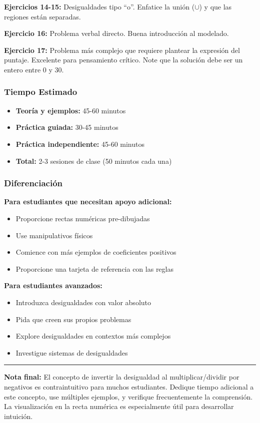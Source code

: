 \textbf{Ejercicios 14-15:} Desigualdades tipo ``o''. Enfatice la unión ($\cup$) y que las regiones están separadas.

\textbf{Ejercicio 16:} Problema verbal directo. Buena introducción al modelado.

\textbf{Ejercicio 17:} Problema más complejo que requiere plantear la expresión del puntaje. Excelente para pensamiento crítico. Note que la solución debe ser un entero entre 0 y 30.

\subsubsection*{Tiempo Estimado}

\begin{itemize}
    \item \textbf{Teoría y ejemplos:} 45-60 minutos
    \item \textbf{Práctica guiada:} 30-45 minutos
    \item \textbf{Práctica independiente:} 45-60 minutos
    \item \textbf{Total:} 2-3 sesiones de clase (50 minutos cada una)
\end{itemize}

\subsubsection*{Diferenciación}

\textbf{Para estudiantes que necesitan apoyo adicional:}
\begin{itemize}
    \item Proporcione rectas numéricas pre-dibujadas
    \item Use manipulativos físicos
    \item Comience con más ejemplos de coeficientes positivos
    \item Proporcione una tarjeta de referencia con las reglas
\end{itemize}

\textbf{Para estudiantes avanzados:}
\begin{itemize}
    \item Introduzca desigualdades con valor absoluto
    \item Pida que creen sus propios problemas
    \item Explore desigualdades en contextos más complejos
    \item Investigue sistemas de desigualdades
\end{itemize}

\vspace{1cm}

\hrule

\vspace{0.5cm}

\textbf{Nota final:} El concepto de invertir la desigualdad al multiplicar/dividir por negativos es contraintuitivo para muchos estudiantes. Dedique tiempo adicional a este concepto, use múltiples ejemplos, y verifique frecuentemente la comprensión. La visualización en la recta numérica es especialmente útil para desarrollar intuición.
